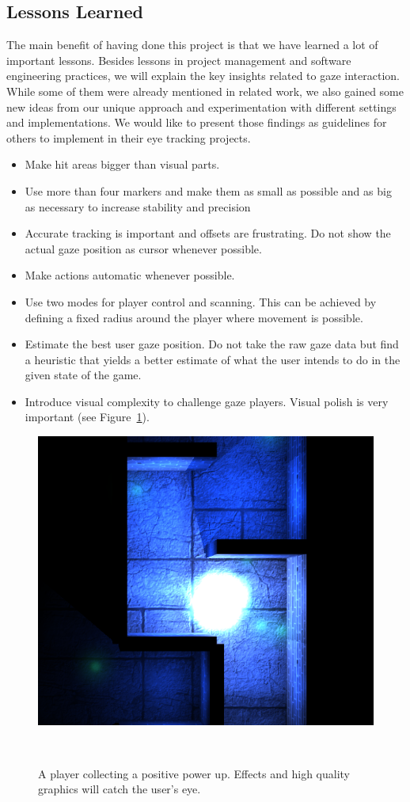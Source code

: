 \documentclass{sigchi}
\begin{document}
\subsection{Lessons Learned}
The main benefit of having done this project is that we have learned a lot of important lessons. Besides lessons in project management and software engineering practices, we will explain the key insights related to gaze interaction. While some of them were already mentioned in related work, we also gained some new ideas from our unique approach and experimentation with different settings and implementations. We would like to present those findings as guidelines for others to implement in their eye tracking projects.
 \begin{itemize}
\item Make hit areas bigger than visual parts.
\item Use more than four markers and make them as small as possible and as big as necessary to increase stability and precision
\item Accurate tracking is important and offsets are frustrating. Do not show the actual gaze position as cursor whenever possible.
\item Make actions automatic whenever possible.
\item Use two modes for player control and scanning. This can be achieved by defining a fixed radius around the player where movement is possible.
\item Estimate the best user gaze position. Do not take the raw gaze data but find a heuristic that yields a better estimate of what the user intends to do in the given state of the game.
\item Introduce visual complexity to challenge gaze players. Visual polish is very important  (see Figure~\ref{fig:figure5}).
\end{itemize}
\begin{figure}
\centering
  \includegraphics[width=0.9\columnwidth]{figures/visuals}
  \caption{A player collecting a positive power up. Effects and high quality graphics will catch the user's eye.}~\label{fig:figure5}
\end{figure}
\end{document}
